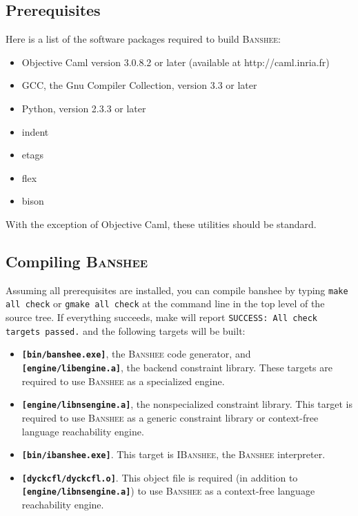 \documentclass[10pt]{article}
\newcommand{\banshee}{\textsc{Banshee}}
\newcommand{\ibanshee}{\textsc{IBanshee}}
\newcommand{\file}[1]{\texttt{\textbf{[#1]}}}
\begin{document}
\subsection{Prerequisites}
Here is a list of the software packages required to build \banshee{}:

\begin{itemize}
\item Objective Caml version 3.0.8.2 or later (available at
  http://caml.inria.fr)
\item GCC, the Gnu Compiler Collection, version 3.3 or later
\item Python, version 2.3.3 or later 
\item indent 
\item etags
\item flex
\item bison
\end{itemize}

With the exception of Objective Caml, these utilities should be
standard.

\subsection{Compiling \banshee{}}

Assuming all prerequisites are installed, you can compile banshee by
typing \texttt{make all check} or \texttt{gmake all check} at the
command line in the top level of the source tree. If everything
succeeds, make will report \texttt{SUCCESS: All check targets passed.}
and the following targets will be built:

\begin{itemize}
\item \file{bin/banshee.exe}, the \banshee{} code generator, and
  \file{engine/libengine.a}, the backend constraint library. These
  targets are required to use \banshee{} as a specialized engine.
\item \file{engine/libnsengine.a}, the nonspecialized constraint
  library. This target is required to use \banshee{} as a generic
  constraint library or context-free language reachability engine.
\item \file{bin/ibanshee.exe}. This target is \ibanshee{}, the
  \banshee{} interpreter.
\item \file{dyckcfl/dyckcfl.o}. This object file is required (in
  addition to \file{engine/libnsengine.a}) to use \banshee{} as a
  context-free language reachability engine.
\end{itemize}
\end{document}
